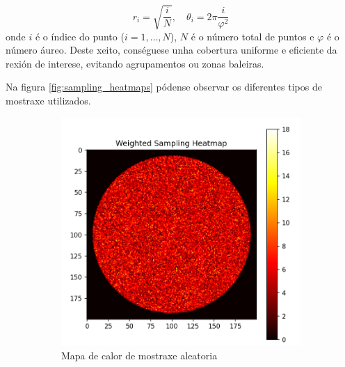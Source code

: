 \[
r_i = \sqrt{\frac{i}{N}}, \quad \theta_i = 2\pi \frac{i}{\varphi^2}
\]
onde $i$ é o índice do punto ($i = 1, \dots, N$), $N$ é o número total de puntos e $\varphi$ é o número áureo. Deste xeito, conséguese unha cobertura uniforme e eficiente da rexión de interese, evitando agrupamentos ou zonas baleiras.

Na figura \ref{fig:sampling_heatmaps} pódense observar os diferentes tipos de mostraxe utilizados.

\begin{figure}[tbp]
    \centering
    \begin{subfigure}[b]{0.3\textwidth}
        \centering
        \includegraphics[width=\textwidth]{imaxes/muestraje/random_sampling_heatmap.png}
        \caption{Mapa de calor de mostraxe aleatoria}
        \label{fig:random_sampling_heatmap}
    \end{subfigure}
    \hfill
    \begin{subfigure}[b]{0.3\textwidth}
        \centering

\end{subfigure}
\end{figure}
